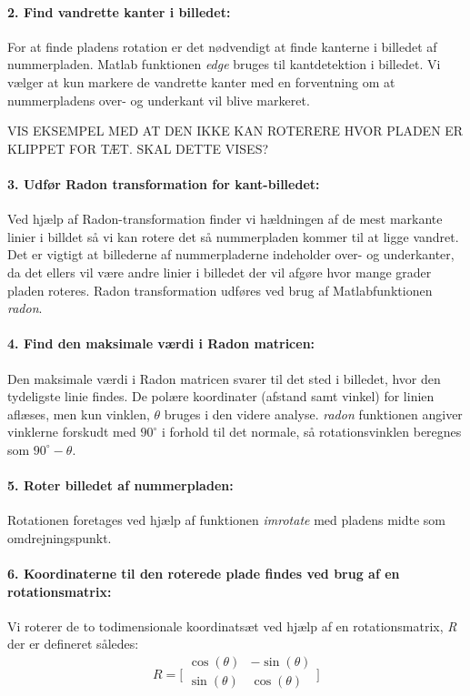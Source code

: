 \paragraph{2. Find vandrette kanter i billedet:}
For at finde pladens rotation er det nødvendigt at finde kanterne i billedet af nummerpladen. Matlab funktionen \textit{edge} bruges til kantdetektion i billedet. Vi vælger at kun markere de vandrette kanter med en forventning om at nummerpladens over- og underkant vil blive markeret.

VIS EKSEMPEL MED AT DEN IKKE KAN ROTERERE HVOR PLADEN ER KLIPPET FOR TÆT. SKAL DETTE VISES?

\paragraph{3. Udfør Radon transformation for kant-billedet:}
Ved hjælp af Radon-transformation finder vi hældningen af de mest markante linier i billdet så vi kan rotere det så nummerpladen kommer til at ligge vandret. Det er vigtigt at billederne af nummerpladerne indeholder over- og underkanter, da det ellers vil være andre linier i billedet der vil afgøre hvor mange grader pladen roteres. Radon transformation udføres ved brug af Matlabfunktionen \textit{radon}.

\paragraph{4. Find den maksimale værdi i Radon matricen:} Den maksimale værdi i Radon matricen svarer til det sted i billedet, hvor den tydeligste linie findes. De polære koordinater (afstand samt vinkel) for linien aflæses, men kun vinklen, $\theta$ bruges i den videre analyse. \textit{radon} funktionen angiver vinklerne forskudt med $90^{\circ}$ i forhold til det normale, så rotationsvinklen beregnes som $90^{\circ} - \theta$.

\paragraph{5. Roter billedet af nummerpladen:} Rotationen foretages ved hjælp af funktionen \textit{imrotate} med pladens midte som omdrejningspunkt.

\paragraph{6. Koordinaterne til den roterede plade findes ved brug af en rotationsmatrix:} Vi roterer de to todimensionale koordinatsæt ved hjælp af en rotationsmatrix, \textit{R} der er defineret således:
\begin{displaymath} 
R = 
\biggl[ \begin{array}{cc} 
\cos(\theta) & - \sin(\theta) \\
\sin(\theta) & \cos(\theta) \\
\end{array} \biggr] 
\end{displaymath}

